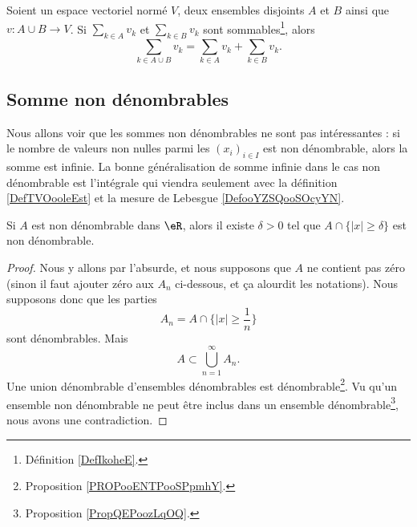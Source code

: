 \begin{proposition}      \label{PROPooJLQAooAEbIvZ}
	Soient un espace vectoriel normé \( V\), deux ensembles disjoints \( A\) et \( B\) ainsi que \( v\colon A\cup B\to V\). Si \( \sum_{k\in A}v_k\) et \( \sum_{k\in B}v_k\) sont sommables\footnote{Définition \ref{DefIkoheE}.}, alors
	\begin{equation}
		\sum_{k\in A\cup B}v_k=\sum_{k\in A}v_k+\sum_{k\in B}v_k.
	\end{equation}
\end{proposition}

\subsection{Somme non dénombrables}

Nous allons voir que les sommes non dénombrables ne sont pas intéressantes : si le nombre de valeurs non nulles parmi les \( (x_i)_{i\in I}\) est non dénombrable, alors la somme est infinie. La bonne généralisation de somme infinie dans le cas non dénombrable est l'intégrale qui viendra seulement avec la définition \ref{DefTVOooleEst} et la mesure de Lebesgue \ref{DefooYZSQooSOcyYN}.

\begin{lemma}       \label{LEMooYJCVooHajEbg}
	Si \( A\) est non dénombrable dans \( \eR\), alors il existe \( \delta>0\) tel que \( A\cap \{ | x |\geq \delta \}\) est non dénombrable.
\end{lemma}

\begin{proof}
	Nous y allons par l'absurde, et nous supposons que \( A\) ne contient pas zéro (sinon il faut ajouter zéro aux \( A_n\) ci-dessous, et ça alourdit les notations). Nous supposons donc que les parties
	\begin{equation}
		A_n=A\cap\{ | x |\geq \frac{1}{ n } \}
	\end{equation}
	sont dénombrables. Mais
	\begin{equation}
		A\subset \bigcup_{n=1}^{\infty}A_n.
	\end{equation}
	Une union dénombrable d'ensembles dénombrables est dénombrable\footnote{Proposition \ref{PROPooENTPooSPpmhY}.}. Vu qu'un ensemble non dénombrable ne peut être inclus dans un ensemble dénombrable\footnote{Proposition \ref{PropQEPoozLqOQ}.}, nous avons une contradiction.
\end{proof}


